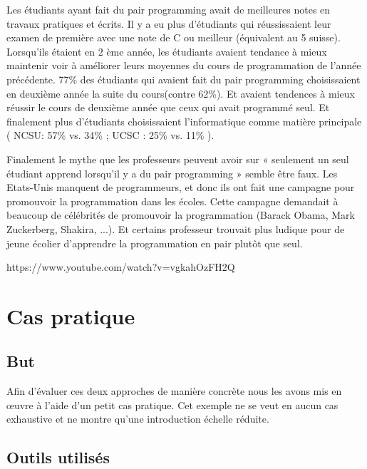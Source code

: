 \documentclass[journal, a4paper]{IEEEtran}
\begin{document}
Les étudiants ayant fait du pair programming avait de meilleures notes en travaux pratiques et écrits.
Il y a eu plus d’étudiants qui réussissaient leur examen de première avec une note de C ou meilleur
(équivalent au 5 suisse). Lorsqu’ils étaient en 2 ème année, les étudiants avaient tendance à mieux
maintenir voir à améliorer leurs moyennes du cours de programmation de l’année précédente. 77\%
des étudiants qui avaient fait du pair programming choisissaient en deuxième année la suite du cours(contre 62\%). Et avaient tendences à mieux réussir le cours de deuxième année que ceux qui avait
programmé seul. Et finalement plus d’étudiants choisissaient l’informatique comme matière
principale ( NCSU: 57\% vs. 34\% ; UCSC : 25\% vs. 11\% ).

Finalement le mythe que les professeurs peuvent avoir sur « seulement un seul étudiant apprend
lorsqu’il y a du pair programming » semble être faux. Les Etats-Unis manquent de programmeurs, et
donc ils ont fait une campagne pour promouvoir la programmation dans les écoles. Cette campagne
demandait à beaucoup de célébrités de promouvoir la programmation (Barack Obama, Mark
Zuckerberg, Shakira, ...). Et certains professeur trouvait plus ludique pour de jeune écolier
d’apprendre la programmation en pair plutôt que seul.

https://www.youtube.com/watch?v=vgkahOzFH2Q

\section{Cas pratique}

\subsection{But}

Afin d'évaluer ces deux approches de manière concrète nous les avons mis en œuvre à l'aide d'un petit cas pratique. Cet exemple ne se veut en aucun cas exhaustive et ne montre qu'une introduction échelle réduite.


\subsection{Outils utilisés}
\end{document}
